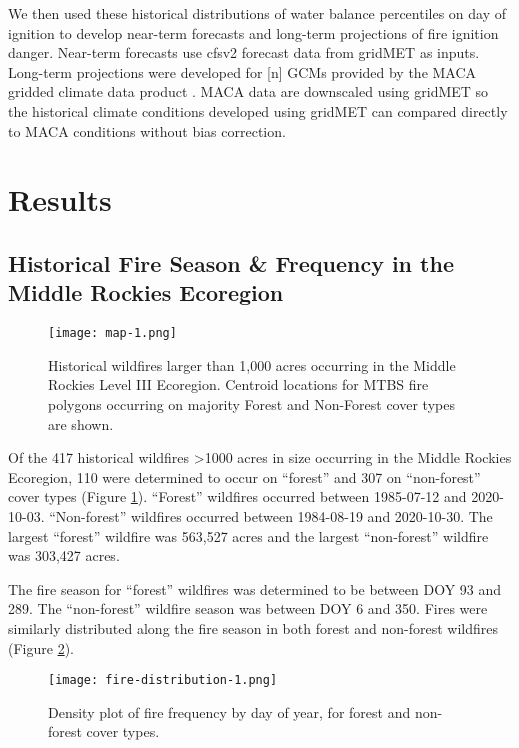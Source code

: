 \documentclass{article}
\begin{document}
We then used these historical distributions of water balance percentiles on day of ignition to develop near-term forecasts and long-term projections of fire ignition danger.  Near-term forecasts use cfsv2 forecast data from gridMET as inputs.  Long-term projections were developed for [n] GCMs provided by the MACA gridded climate data product \citep{abatzoglouComparisonStatisticalDownscaling2012}.  MACA data are downscaled using gridMET so the historical climate conditions developed using gridMET can compared directly to MACA conditions without bias correction.

\section{Results}

\subsection{Historical Fire Season \& Frequency in the Middle Rockies Ecoregion}

\begin{figure}[ht]
  \texttt{[image: map-1.png]}
  \caption{Historical wildfires larger than 1,000 acres occurring in the Middle Rockies Level III Ecoregion.  Centroid locations for MTBS fire polygons occurring on majority Forest and Non-Forest cover types are shown.}
  \label{fig:map}
\end{figure}

Of the 417 historical wildfires \textgreater1000 acres in size occurring in the Middle Rockies Ecoregion, 110 were determined to occur on ``forest'' and 307 on ``non-forest'' cover types (Figure \ref{fig:map}).  ``Forest'' wildfires occurred between 1985-07-12 and 2020-10-03.  ``Non-forest'' wildfires occurred between 1984-08-19 and 2020-10-30.  The largest ``forest'' wildfire was 563,527 acres and the largest ``non-forest'' wildfire was 303,427 acres.

The fire season for ``forest'' wildfires was determined to be between DOY 93 and 289.  The ``non-forest'' wildfire season was between DOY 6 and 350.  Fires were similarly distributed along the fire season in both forest and non-forest wildfires (Figure \ref{fig:fire-dens}).  

\begin{figure}[ht]
  \texttt{[image: fire-distribution-1.png]}
  \caption{Density plot of fire frequency by day of year, for forest and non-forest cover types.}
  \label{fig:fire-dens}
\end{figure}
\end{document}
